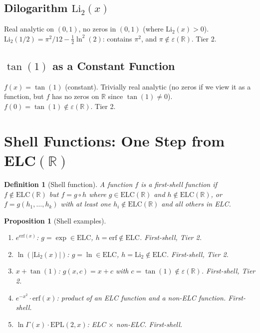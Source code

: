 \documentclass[11pt]{article}
\newtheorem{proposition}[theorem]{Proposition}
\newtheorem{definition}[theorem]{Definition}
\begin{document}
\subsection{Dilogarithm $\mathrm{Li}_2(x)$}

Real analytic on $(0,1)$, no zeros in $(0,1)$ (where $\mathrm{Li}_2(x)>0$).
$\mathrm{Li}_2(1/2)=\pi^2/12-\tfrac12\ln^2(2)$: contains $\pi^2$,
and $\pi\notin\varepsilon(\mathbb{R})$. Tier 2.

\subsection{$\tan(1)$ as a Constant Function}

$f(x)=\tan(1)$ (constant). Trivially real analytic (no zeros if we view it as a function,
but $f$ has no zeros on $\mathbb{R}$ since $\tan(1)\neq0$).
$f(0)=\tan(1)\notin\varepsilon(\mathbb{R})$. Tier 2.

\section{Shell Functions: One Step from ELC$(\mathbb{R})$}

\begin{definition}[Shell function]
A function $f$ is a \emph{first-shell function} if $f\notin\mathrm{ELC}(\mathbb{R})$ but
$f=g\circ h$ where $g\in\mathrm{ELC}(\mathbb{R})$ and $h\notin\mathrm{ELC}(\mathbb{R})$,
or $f=g(h_1,\ldots,h_k)$ with at least one $h_i\notin\mathrm{ELC}(\mathbb{R})$ and all others in ELC.
\end{definition}

\begin{proposition}[Shell examples]
\begin{enumerate}
  \item $e^{\mathrm{erf}(x)}$: $g=\exp\in\mathrm{ELC}$, $h=\mathrm{erf}\notin\mathrm{ELC}$. First-shell, Tier 2.
  \item $\ln(|\mathrm{Li}_2(x)|)$: $g=\ln\in\mathrm{ELC}$, $h=\mathrm{Li}_2\notin\mathrm{ELC}$. First-shell, Tier 2.
  \item $x+\tan(1)$: $g(x,c)=x+c$ with $c=\tan(1)\notin\varepsilon(\mathbb{R})$. First-shell, Tier 2.
  \item $e^{-x^2}\cdot\mathrm{erf}(x)$: product of an ELC function and a non-ELC function. First-shell.
  \item $\ln\Gamma(x)\cdot\mathrm{EPL}(2,x)$: ELC $\times$ non-ELC. First-shell.
\end{enumerate}
\end{proposition}
\end{document}
